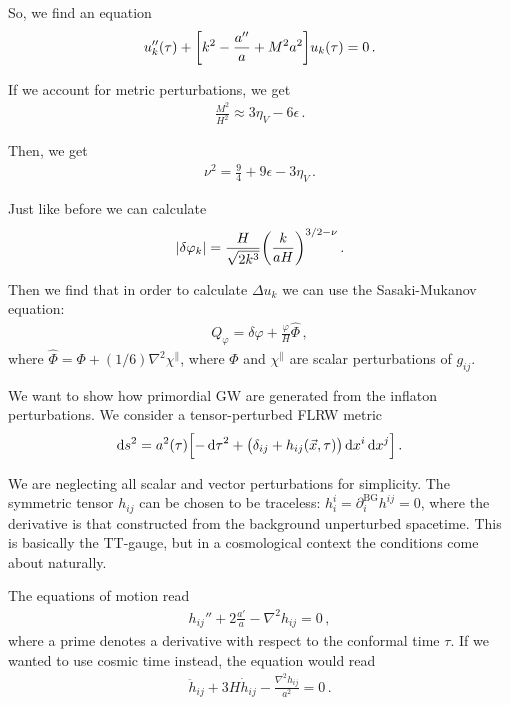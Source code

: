 \documentclass[main.tex]{subfiles}
\begin{document}
So, we find an equation 
%
\begin{align}
u''_k (\tau ) + \qty[ k^2 - \frac{a''}{a} + M^2a^2] u_k (\tau ) = 0
\,.
\end{align}

If we account for metric perturbations, we get 
%
\begin{align}
\frac{M^2}{H^2} \approx 3 \eta _V - 6 \epsilon 
\,.
\end{align}

Then, we get 
%
\begin{align}
\nu^2 = \frac{9}{4} + 9 \epsilon - 3 \eta _V 
\,.
\end{align}

Just like before we can calculate 
%
\begin{align}
\abs{ \delta \varphi _k} = \frac{H}{\sqrt{2 k^3}} \qty( \frac{k}{aH})^{3/2 - \nu }
\,.
\end{align}

Then we find that in order to calculate \(\Delta u_k\) we can use the Sasaki-Mukanov equation:
%
\begin{align}
Q_\varphi = \delta \varphi + \frac{\varphi }{H} \hat{\Phi}
\,,
\end{align}
%
where \(\hat{\Phi} = \Phi + (1/6) \nabla^2 \chi^{\parallel}\), where \(\Phi \) and \(\chi^{\parallel}\) are scalar perturbations of \(g_{ij}\).

We want to show how primordial GW are generated from the inflaton perturbations.
We consider a tensor-perturbed FLRW metric 
%
\begin{align}
\dd{s^2} = a^2 (\tau )
\qty[- \dd{\tau}^2 + \qty(\delta_{ij} + h_{ij} (\vec{x}, \tau )) \dd{x^{i}} \dd{x^{j}}]
\,.
\end{align}

We are neglecting all scalar and vector perturbations for simplicity. 
The symmetric tensor \(h_{ij}\) can be chosen to be traceless: \(h^{i}_{i} = \partial_{i}^{\text{BG}} h^{ij} = 0 \), where the derivative is that constructed from the background unperturbed spacetime. 
This is basically the TT-gauge, but in a cosmological context the conditions come about naturally. 

The equations of motion read 
%
\begin{align}
h_{ij}'' + 2 \frac{a'}{a} - \nabla^2 h_{ij} = 0
\,,
\end{align}
%
where a prime denotes a derivative with respect to the conformal time \(\tau \).
If we wanted to use cosmic time instead, the equation would read 
%
\begin{align}
\ddot{h}_{ij} + 3 H \dot{h}_{ij} - \frac{\nabla^2 h_{ij}}{a^2} = 0
\,.
\end{align}
\end{document}
